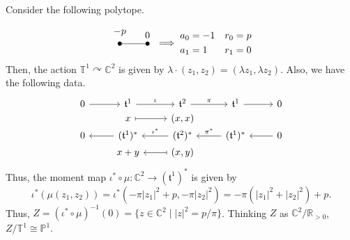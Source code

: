 \documentclass[b5paper]{article}
\newcommand{\acton}{\curvearrowright}
\begin{document}
\begin{example}{}
    Consider the following polytope.
    \begin{equation*}
        \begin{tikzpicture}[every node/.style={circle,fill=black,minimum width=1.5pt,inner sep=1.5pt}]
            \node[label={$-p$}] (A) at (0,0) {};
            \node[label={$0$}] (B) at (1,0) {};
            \draw (A) -- (B);
        \end{tikzpicture}
        \implies
        \begin{aligned}
            a_0 &= -1 & r_0 &= p \\
            a_1 &= 1 & r_1 &= 0
        \end{aligned}
    \end{equation*}
    Then, the action $\mathbb{T}^1 \acton \mathbb{C}^2$ is given by $\lambda \cdot (z_1, z_2) = (\lambda z_1, \lambda z_2)$. Also, we have the following data.
    \begin{equation*}
        \begin{tikzcd}[row sep=0ex]
            0 \arrow[r] & \mathfrak{t}^1 \arrow[r, "\iota"] & \mathfrak{t}^2 \arrow[r, "\pi"] & \mathfrak{t}^1 \arrow[r] & 0 \\
            {} & x \arrow[r, maps to] & (x, x) & {} & {} \\
            0 & (\mathfrak{t}^1)^* \arrow[l] & (\mathfrak{t}^2)^* \arrow[l, "\iota^*"'] & (\mathfrak{t}^1)^* \arrow[l, "\pi^*"'] & 0 \arrow[l] \\
            {} & x+y & (x, y) \arrow[l, maps to] & {} & {}
        \end{tikzcd}
    \end{equation*}
    Thus, the moment map $\iota^* \circ \mu : \mathbb{C}^2 \to (\mathfrak{t}^1)^*$ is given by
    \begin{equation*}
        \iota^*(\mu(z_1, z_2)) = \iota^*(-\pi|z_1|^2+p, -\pi|z_2|^2) = -\pi(|z_1|^2+|z_2|^2) + p.
    \end{equation*}
    Thus, $Z = (\iota^* \circ \mu)^{-1}(0) = \{ z \in \mathbb{C}^2 \mid |z|^2 = p/\pi \}$. Thinking $Z$ as $\mathbb{C}^2 / \mathbb{R}_{>0}$, $Z/\mathbb{T}^1 \cong \mathbb{P}^1$.
\end{example}
\end{document}

